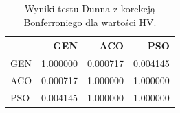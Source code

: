 \begin{table}
\caption{Wyniki testu Dunna z korekcją Bonferroniego dla wartości HV.}
\label{tab:dunn_global}
\begin{tabular}{lrrr}
\toprule
 & GEN & ACO & PSO \\
\midrule
GEN & 1.000000 & 0.000717 & 0.004145 \\
ACO & 0.000717 & 1.000000 & 1.000000 \\
PSO & 0.004145 & 1.000000 & 1.000000 \\
\bottomrule
\end{tabular}
\end{table}

